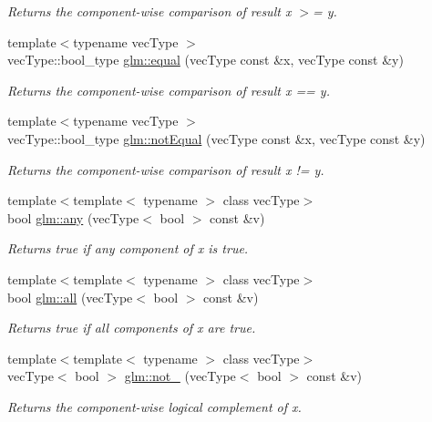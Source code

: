 \begin{DoxyCompactItemize}
\begin{DoxyCompactList}\small\item\em Returns the component-\/wise comparison of result x $>$= y. \end{DoxyCompactList}\item 
{\footnotesize template$<$typename vec\-Type $>$ }\\vec\-Type\-::bool\-\_\-type \hyperlink{group__core__func__vector__relational_gaeded4966b21a46182176fc6e24e05fdd}{glm\-::equal} (vec\-Type const \&x, vec\-Type const \&y)
\begin{DoxyCompactList}\small\item\em Returns the component-\/wise comparison of result x == y. \end{DoxyCompactList}\item 
{\footnotesize template$<$typename vec\-Type $>$ }\\vec\-Type\-::bool\-\_\-type \hyperlink{group__core__func__vector__relational_ga20caef2fbce3eacb97e895f2ed315271}{glm\-::not\-Equal} (vec\-Type const \&x, vec\-Type const \&y)
\begin{DoxyCompactList}\small\item\em Returns the component-\/wise comparison of result x != y. \end{DoxyCompactList}\item 
{\footnotesize template$<$template$<$ typename $>$ class vec\-Type$>$ }\\bool \hyperlink{group__core__func__vector__relational_ga7141e1fafe91560d8c8789901d1c1271}{glm\-::any} (vec\-Type$<$ bool $>$ const \&v)
\begin{DoxyCompactList}\small\item\em Returns true if any component of x is true. \end{DoxyCompactList}\item 
{\footnotesize template$<$template$<$ typename $>$ class vec\-Type$>$ }\\bool \hyperlink{group__core__func__vector__relational_ga349edc1a383fff08c6d577428416a73b}{glm\-::all} (vec\-Type$<$ bool $>$ const \&v)
\begin{DoxyCompactList}\small\item\em Returns true if all components of x are true. \end{DoxyCompactList}\item 
{\footnotesize template$<$template$<$ typename $>$ class vec\-Type$>$ }\\vec\-Type$<$ bool $>$ \hyperlink{group__core__func__vector__relational_gac44e885cf2f0b0896124d7ce5df6ed4f}{glm\-::not\-\_\-} (vec\-Type$<$ bool $>$ const \&v)
\begin{DoxyCompactList}\small\item\em Returns the component-\/wise logical complement of x. \end{DoxyCompactList}\end{DoxyCompactItemize}


